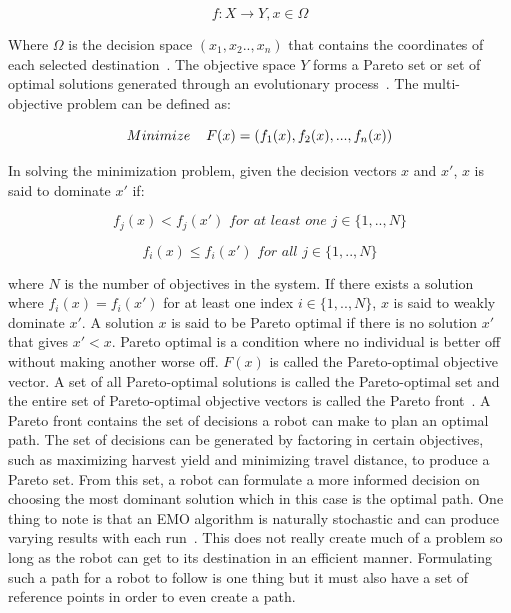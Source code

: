 \documentclass[12pt]{article}
\begin{document}
\begin{equation}
    f: X \rightarrow Y, x \in \Omega
\end{equation}

\noindent Where $\Omega$ is the decision space $(x_1, x_2..,x_n)$ that contains the coordinates of each selected destination~\cite{MAHMUD2019488}. The objective space $Y$ forms a Pareto set or set of optimal solutions generated through an evolutionary process~\cite{zhou2021problem,zitzler2004tutorial}. The multi-objective problem can be defined as:

\begin{equation}
    Minimize \hspace{4mm} F(x) = (f_1(x), f_2(x), ..., f_n(x))
\end{equation}

\noindent In solving the minimization problem, given the decision vectors $x$ and $x'$, $x$ is said to dominate $x'$ if:

\begin{equation}
    f_j(x) < f_j(x') \textit{ for at least one } j \in \{1,..,N\}
\end{equation}

\begin{equation}
    f_i(x) \le f_i(x') \textit{ for all } j \in \{1,..,N\}
\end{equation}

\noindent where $N$ is the number of objectives in the system. If there exists a solution where $f_i(x) = f_i(x')$ for at least one index $i \in \{1,..,N\}$, $x$ is said to weakly dominate $x'$. A solution $x$ is said to be Pareto optimal if there is no solution $x'$ that gives $x' < x$. Pareto optimal is a condition where no individual is better off without making another worse off. $F(x)$ is called the Pareto-optimal objective vector. A set of all Pareto-optimal solutions is called the Pareto-optimal set and the entire set of Pareto-optimal objective vectors is called the Pareto front~\cite{MAHMUD2019488}. A Pareto front contains the set of decisions a robot can make to plan an optimal path. The set of decisions can be generated by factoring in certain objectives, such as maximizing harvest yield and minimizing travel distance, to produce a Pareto set. From this set, a robot can formulate a more informed decision on choosing the most dominant solution which in this case is the optimal path. One thing to note is that an EMO algorithm is naturally stochastic and can produce varying results with each run~\cite{ahmed2013multi}. This does not really create much of a problem so long as the robot can get to its destination in an efficient manner. Formulating such a path for a robot to follow is one thing but it must also have a set of reference points in order to even create a path.
\end{document}
